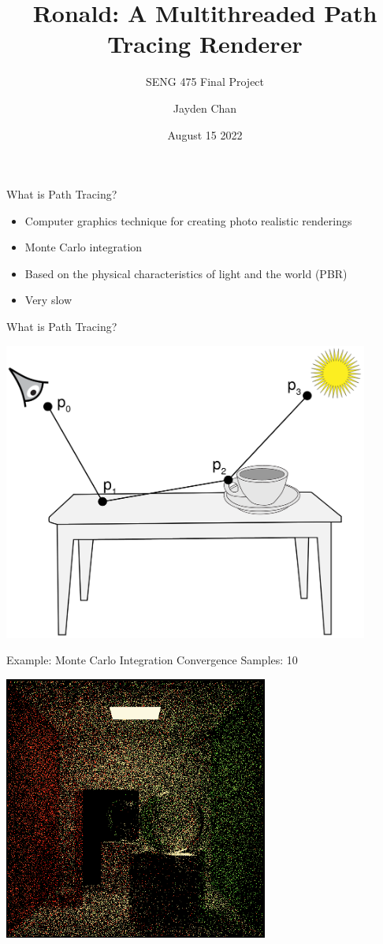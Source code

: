 \documentclass{beamer}
\title{Ronald: A Multithreaded Path Tracing Renderer}
\subtitle{SENG 475 Final Project}
\author{Jayden Chan}
\institute{\href{https://github.com/jayden-chan/ronald}{https://github.com/jayden-chan/ronald}}
\date{August 15 2022}
\begin{document}
\begin{frame}
\titlepage
\end{frame}

\begin{frame}{What is Path Tracing?}
    \begin{itemize}[<+->]
        \item Computer graphics technique for creating photo realistic renderings
        \item Monte Carlo integration
        \item Based on the physical characteristics of light and the world (PBR)
        \item Very slow
    \end{itemize}
\end{frame}

\begin{frame}{What is Path Tracing?}
    \begin{center}
        \includegraphics[width=0.9\textwidth]{./path_tracing.png}
    \end{center}
\end{frame}

\begin{frame}{Example: Monte Carlo Integration Convergence}
    Samples: 10
    \begin{center}
        \includegraphics[width=0.65\textwidth]{../img/convergence/cornell-00010.png}
    \end{center}
\end{frame}
\end{document}
